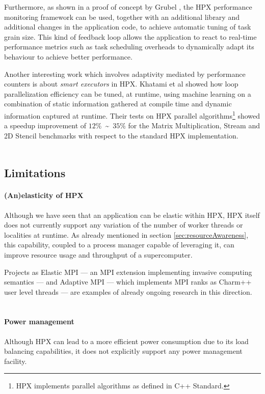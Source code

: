 Furthermore, as shown in a proof of concept by Grubel \cite{grubel2016dynamic}, the HPX performance monitoring framework can be used, together with an additional library and additional changes in the application code, to achieve automatic tuning of task grain size. This kind of feedback loop allows the application to react to real-time performance metrics such as task scheduling overheads to dynamically adapt its behaviour to achieve better performance.

Another interesting work which involves adaptivity mediated by performance counters is about \emph{smart executors} in HPX. Khatami et al \cite{khatami2017hpx} showed how loop parallelization efficiency can be tuned, at runtime, using machine learning on a combination of static information gathered at compile time and dynamic information captured at runtime. Their tests on HPX parallel algorithms\footnote{HPX implements parallel algorithms as defined in C++ Standard.} showed a speedup improvement of $12\%$~\textasciitilde~$35\%$ for the Matrix Multiplication, Stream and 2D Stencil benchmarks with respect to the standard HPX implementation.
~\\~

\subsection{Limitations} \label{subsec:limitations}
\paragraph{(An)elasticity of HPX}
Although we have seen that an application can be elastic within HPX, HPX itself does not currently support any variation of the number of worker threads or localities at runtime. As already mentioned in section \ref{sec:resourceAwareness}, this capability, coupled to a process manager capable of leveraging it, can improve resource usage and throughput of a supercomputer.

Projects as Elastic MPI --- an MPI extension implementing invasive computing semantics\cite{urena2017resource} --- and Adaptive MPI --- which implements MPI ranks as Charm++ user level threads\cite{gupta2014towards,prabhakaran2015batch} --- are examples of already ongoing research in this direction.
~\\~

\paragraph{Power management}
Although HPX can lead to a more efficient power consumption due to its load balancing capabilities, it does not explicitly support any power management facility.

